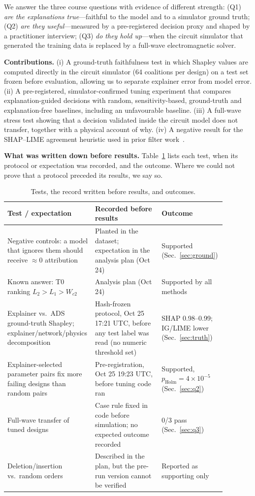 \documentclass[conference,onecolumn,10pt]{IEEEtran}
\begin{document}
We answer the three course questions with evidence of different strength:
(Q1) \emph{are the explanations true}---faithful to the model and to a simulator ground truth;
(Q2) \emph{are they useful}---measured by a pre-registered decision proxy and shaped by a practitioner interview;
(Q3) \emph{do they hold up}---when the circuit simulator that generated the training data is replaced by a full-wave electromagnetic solver.

\textbf{Contributions.}
(i) A ground-truth faithfulness test in which Shapley values are computed directly in the circuit simulator (64 coalitions per design) on a test set frozen before evaluation, allowing us to separate explainer error from model error.
(ii) A pre-registered, simulator-confirmed tuning experiment that compares explanation-guided decisions with random, sensitivity-based, ground-truth and explanation-free baselines, including an unfavourable baseline.
(iii) A full-wave stress test showing that a decision validated inside the circuit model does not transfer, together with a physical account of why.
(iv) A negative result for the SHAP--LIME agreement heuristic used in prior filter work~\cite{suslova2026}.

\textbf{What was written down before results.} Table~\ref{tab:prereg} lists each test, when its protocol or expectation was recorded, and the outcome. Where we could not prove that a protocol preceded its results, we say so.

\begin{table}[htbp]
\centering
\caption{Tests, the record written before results, and outcomes.}
\label{tab:prereg}
\small
\begin{tabular}{p{0.30\linewidth}p{0.30\linewidth}p{0.28\linewidth}}
\toprule
Test / expectation & Recorded before results & Outcome \\
\midrule
Negative controls: a model that ignores them should receive $\approx0$ attribution & Planted in the dataset; expectation in the analysis plan (Oct 24) & Supported (Sec.~\ref{sec:ground}) \\
Known answer: T0 ranking $L_2>L_1>W_{c2}$ & Analysis plan (Oct 24) & Supported by all methods \\
Explainer vs.\ ADS ground-truth Shapley; explainer/network/physics decomposition & Hash-frozen protocol, Oct 25 17:21 UTC, before any test label was read (no numeric threshold set) & SHAP 0.98--0.99; IG/LIME lower (Sec.~\ref{sec:truth}) \\
Explainer-selected parameter pairs fix more failing designs than random pairs & Pre-registration, Oct 25 19:23 UTC, before tuning code ran & Supported, $p_\text{Holm}=4\times10^{-5}$ (Sec.~\ref{sec:q2}) \\
Full-wave transfer of tuned designs & Case rule fixed in code before simulation; no expected outcome recorded & 0/3 pass (Sec.~\ref{sec:q3}) \\
Deletion/insertion vs.\ random orders & Described in the plan, but the pre-run version cannot be verified & Reported as supporting only \\
\bottomrule
\end{tabular}
\end{table}
\end{document}
